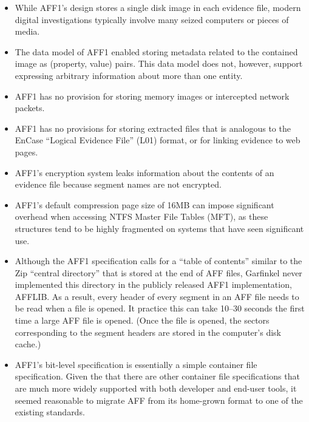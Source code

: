 \documentclass[10pt, conference]{IEEEtran}
\begin{document}
\begin{itemize}
\item While AFF1's design stores a single disk image in each evidence
  file, modern digital investigations typically involve many seized
  computers or pieces of media. 

\item The data model of AFF1 enabled storing metadata related to the 
  contained image as (property, value) pairs. This data model does
  not, however, support expressing arbitrary information about more
  than one entity.

\item AFF1 has no provision for storing memory images or intercepted
  network packets.

\item AFF1 has no provisions for storing extracted files that is
  analogous to the EnCase ``Logical Evidence File'' (L01) format, or
  for linking evidence to web pages.

\item AFF1's encryption system leaks information about the contents of
  an evidence file because segment names are not encrypted.

\item AFF1's default compression page size of 16MB can impose significant overhead
  when accessing NTFS Master File Tables (MFT), as these structures
  tend to be highly fragmented on systems that have seen significant
  use.

\item Although the AFF1 specification calls for a ``table of contents'' similar
  to the Zip\cite{zip-format} ``central directory'' that is stored at
  the end of AFF files, Garfinkel never implemented this directory in
  the publicly released AFF1 implementation, AFFLIB. As a result,
  every header of every segment in an AFF file needs to be read when a
  file is opened. It practice this can take 10--30 seconds the first
  time a large AFF file is opened. (Once the file is opened, the
  sectors corresponding to the segment headers are stored in the
  computer's disk cache.)

\item AFF1's bit-level specification is essentially a simple container
  file specification. Given the that there are other container file
  specifications that are much more widely supported with both
  developer and end-user tools, it seemed reasonable to migrate AFF
  from its home-grown format to one of the existing standards.

\end{itemize}
\end{document}
